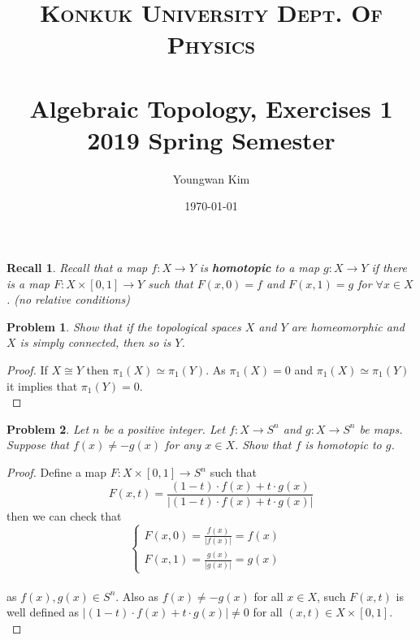 \documentclass[paper=a4, fontsize=11pt]{scrartcl}
\title{	
	\normalfont \normalsize 
	\textsc{Konkuk University Dept. Of Physics} \\ [25pt] %
	\horrule{1pt} \\[0.4cm] 
	\huge Algebraic Topology, Exercises 1 \\
	\vspace{0.1in}
	\Large 2019 Spring Semester
	\horrule{1pt} \\[0.4cm] 
}
\author{Youngwan Kim}
\date{\normalsize\today}
\newtheorem*{recall}{Recall}
\newtheorem{problem}{Problem}
\begin{document}
	
\maketitle	

\begin{recall}
	Recall that a map $f:X \to Y $ is \textbf{homotopic} to a map $g:X\to Y$ if there is a map $F:X\times[0,1]\to Y$ such that $F(x,0)=f$ and $F(x,1)=g$ for $\forall x\in X$. (no relative conditions)\\
\end{recall}

\begin{problem}
	Show that if the topological spaces $X$ and $Y$ are homeomorphic and $X$ is simply connected, then so is $Y$.\\
\end{problem}


\begin{proof}
	If $X \cong Y $ then $\pi_1(X) \simeq \pi_1(Y)$. As $\pi_1(X) = 0$ and $\pi_1(X) \simeq \pi_1(Y)$\, it implies that $\pi_1(Y) = 0$.\\
\end{proof}

\begin{problem}
	Let $n$ be a positive integer. Let $f:X\to S^n$ and $g:X\to S^n$ be maps. Suppose that $f(x)\neq -g(x)$ for any $x \in X$. Show that $f$ is homotopic to $g$.\\
\end{problem}

\begin{proof}
	Define a map $ F:X \times [0,1] \to S^n$ such that \\
	\begin{equation}\nonumber
		F(x,t) = \frac{(1-t)\cdot f(x)+t \cdot g(x)}{|(1-t)\cdot f(x)+t \cdot g(x)|}
	\end{equation}
	then we can check that\\
	\begin{equation}\nonumber
		\begin{cases}
		F(x,0)=\frac{f(x)}{|f(x)|}=f(x) & \\
		F(x,1)=\frac{g(x)}{|g(x)|}=g(x)
		\end{cases}
	\end{equation}\\
	as $f(x),g(x)\in S^n$. Also as $f(x)\neq -g(x)$ for all $x \in X$, such $F(x,t)$ is well defined as $|(1-t)\cdot f(x)+t \cdot g(x)| \neq 0$ for all $(x,t) \in X \times [0,1]$.\\
\end{proof}
\end{document}
